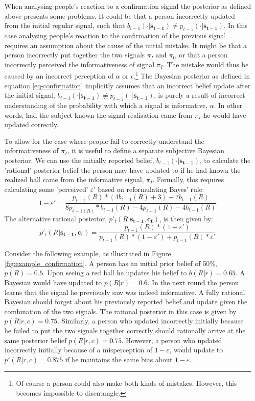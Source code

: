 \documentclass{article}
\begin{document}
When analysing people's reaction to a confirmation signal the posterior as defined above presents some problems. It could be that a person incorrectly updated from the initial regular signal, such that $b_{t-1}(\cdot|\mathbf{s_{t-1}}) \neq p_{t-1}(\cdot|\mathbf{s_{t-1}})$. In this case analysing people's reaction to the confirmation of the previous signal requires an assumption about the cause of the initial mistake. It might be that a person incorrectly put together the two signals $\pi_I$ and $\pi_U$ or that a person incorrectly perceived the informativeness of signal $\pi_I$. The mistake would thus be caused by an incorrect perception of $\alpha$ or $\epsilon$.\footnote{Of course a person could also make both kinds of mistakes. However, this becomes impossible to disentangle.} The Bayesian posterior as defined in equation \ref{eq-confirmation} implicitly assumes that an incorrect belief update after the initial signal, $b_{t-1}(\cdot|\mathbf{s_{t-1}}) \neq p_{t-1}(\cdot|\mathbf{s_{t-1}})$, is purely a result of incorrect understanding of the probability with which a signal is informative, $\alpha$. In other words, had the subject known the signal realisation came from $\pi_I$ he would have updated correctly. 

To allow for the case where people fail to correctly understand the informativeness of $\pi_I$, it is useful to define a separate subjective Bayesian posterior. We can use the initially reported belief, $b_{t-1}(\cdot|\mathbf{s_{t-1}})$, to calculate the 'rational' posterior belief the person may have updated to if he had known the realized ball came from the informative signal, $\pi_I$. Formally, this requires calculating some 'perceived' $\varepsilon'$ based on reformulating Bayes' rule:
\begin{equation*}
    1-\varepsilon' = \frac{p_{t-1}(R)*(4b_{t-1}(R)+3)-7b_{t-1}(R)}{8p_{t-1(R)}*b_{t-1}(R)-4p_{t-1}(R)-4b_{t-1}(R)}
\end{equation*}
The alternative rational posterior, $p'_t(R|\mathbf{s_{t-1},\mathbf{c_t}})$, is then given by:
\begin{equation}
    \label{eq-confirmation-alt}
    p'_t(R|\mathbf{s_{t-1},\mathbf{c_t}})=\frac{p_{t-1}(R)*(1-\varepsilon')}{p_{t-1}(R)*(1-\varepsilon')+p_{t-1}(B)*\varepsilon'}
\end{equation}

Consider the following example, as illustrated in Figure \ref{fig:example_confirmation}. A person has an initial prior belief of 50\%, $p(R)=0.5$. Upon seeing a red ball he updates his belief to $b(R|r)=0.65$. A Bayesian would have updated to $p(R|r)=0.6$. In the next round the person learns that the signal he previously saw was indeed informative. A fully rational Bayesian should forget about his previously reported belief and update given the combination of the two signals. The rational posterior in this case is given by $p(R|r,c)=0.75$. Similarly, a person who updated incorrectly initially because he failed to put the two signals together correctly should rationally arrive at the same posterior belief $p(R|r,c)=0.75$. However, a person who updated incorrectly initially because of a misperception of $1-\varepsilon$, would update to $p'(R|r,c)=0.875$ if he maintains the same bias about $1-\varepsilon$.
\end{document}
